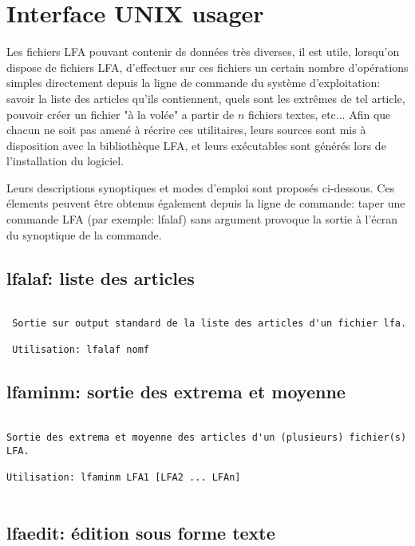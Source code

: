 \documentclass[10pt,french]{book}
\begin{document}
\chapter{Interface UNIX usager}

\p  Les fichiers LFA pouvant contenir
ds données très diverses, 
il est utile, lorsqu'on  dispose  de fichiers LFA, 
d'effectuer  sur  ces  fichiers  un  certain  nombre d'opérations simples
directement  depuis  la  ligne  de  commande  du système d'exploitation:
savoir la liste des articles qu'ils contiennent, quels sont les extrêmes
de  tel article, pouvoir créer un
fichier  "à  la  volée" a partir de $n$ fichiers textes, etc... Afin que
chacun  ne  soit pas amené à récrire ces utilitaires, leurs sources sont
mis  à  disposition  avec la bibliothèque LFA, et leurs exécutables sont
générés lors de l'installation du logiciel.

\p Leurs descriptions synoptiques et modes d'emploi sont proposés
ci-dessous. Ces élements peuvent être obtenus également depuis
la ligne de commande: taper une commande LFA (par exemple: lfalaf)
sans argument provoque la sortie à l'écran du synoptique de la commande.

\section{lfalaf: liste des articles}

\begin{verbatim}
  
 Sortie sur output standard de la liste des articles d'un fichier lfa.
  
 Utilisation: lfalaf nomf

\end{verbatim}

\section{lfaminm: sortie des extrema et moyenne}
\begin{verbatim}
 
Sortie des extrema et moyenne des articles d'un (plusieurs) fichier(s) LFA.
 
Utilisation: lfaminm LFA1 [LFA2 ... LFAn]
 
\end{verbatim}

\section{lfaedit: édition sous forme texte}
\end{document}
